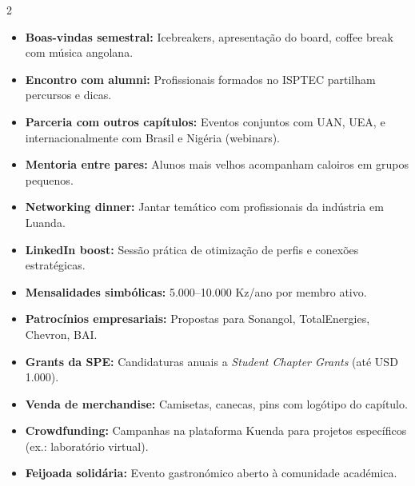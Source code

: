 \documentclass[11pt]{article}
\begin{document}
\begin{multicols}{2}
\begin{tcolorbox}[title={\large\color{spedark}🤝 Networking e Integração}]
  \begin{itemize}
    \item \textbf{Boas-vindas semestral:} Icebreakers, apresentação do board, coffee break com música angolana.
    \item \textbf{Encontro com alumni:} Profissionais formados no ISPTEC partilham percursos e dicas.
    \item \textbf{Parceria com outros capítulos:} Eventos conjuntos com UAN, UEA, e internacionalmente com Brasil e Nigéria (webinars).
    \item \textbf{Mentoria entre pares:} Alunos mais velhos acompanham caloiros em grupos pequenos.
    \item \textbf{Networking dinner:} Jantar temático com profissionais da indústria em Luanda.
    \item \textbf{LinkedIn boost:} Sessão prática de otimização de perfis e conexões estratégicas.
  \end{itemize}
\end{tcolorbox}

\begin{tcolorbox}[title={\large\color{spedark}💰 Captação de Recursos}]
  \begin{itemize}
    \item \textbf{Mensalidades simbólicas:} 5.000–10.000 Kz/ano por membro ativo.
    \item \textbf{Patrocínios empresariais:} Propostas para Sonangol, TotalEnergies, Chevron, BAI.
    \item \textbf{Grants da SPE:} Candidaturas anuais a \emph{Student Chapter Grants} (até USD 1.000).
    \item \textbf{Venda de merchandise:} Camisetas, canecas, pins com logótipo do capítulo.
    \item \textbf{Crowdfunding:} Campanhas na plataforma Kuenda para projetos específicos (ex.: laboratório virtual).
    \item \textbf{Feijoada solidária:} Evento gastronómico aberto à comunidade académica.
  \end{itemize}
\end{tcolorbox}

\columnbreak


\end{multicols}
\end{document}
